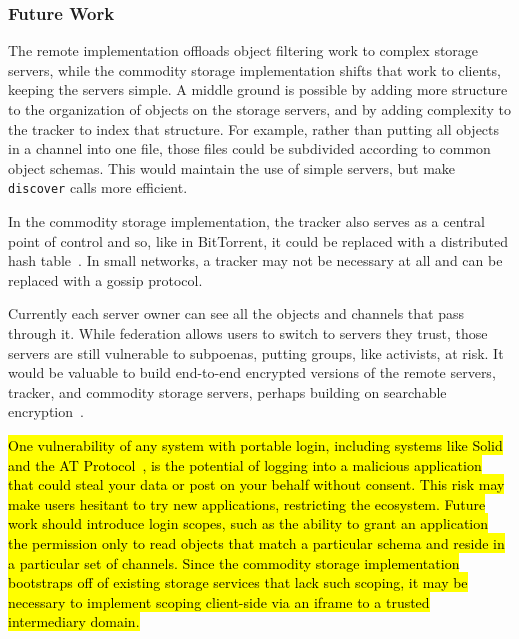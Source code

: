 
\subsubsection{Future Work}
\label{above-and-below:below:future-work}

The remote implementation offloads object filtering work to complex storage servers,
while the commodity storage implementation shifts that work to clients, keeping the servers simple.
A middle ground is possible by adding more structure to the organization of objects on
the storage servers, and by adding complexity to the tracker to index that structure.
For example, rather than putting all objects in a channel into one file,
those files could be subdivided according to common object schemas.
This would maintain the use of simple servers, but make \texttt{discover} calls more efficient.

In the commodity storage implementation, the tracker also serves as a central point of control and so, like in BitTorrent,
it could be replaced with a distributed hash table~\cite{bittorrentdht}. In small networks,
a tracker may not be necessary at all and can be replaced with a gossip protocol.

Currently each server owner can see all the objects and channels
that pass through it. While federation allows users to switch
to servers they trust, those servers are still vulnerable to
subpoenas, putting groups, like activists, at risk.
It would be valuable to build end-to-end encrypted versions of the remote servers,
tracker, and commodity storage servers, perhaps building on
searchable encryption~\cite{searchableencryption}.

\hl{%
One vulnerability of any system with portable login,
including systems like Solid and the AT Protocol~{\cite{bluesky}},
is the potential of logging into
a malicious application that could steal your data or
post on your behalf without consent.
This risk may make users hesitant to try new applications,
restricting the ecosystem.
Future work should introduce login scopes, such as
the ability to grant an application the permission only to read objects
that match a particular schema and reside in a particular set of channels.
Since the commodity storage implementation bootstraps off of
existing storage services that lack such scoping,
it may be necessary to implement scoping client-side
via an iframe to a trusted intermediary domain.
}%

